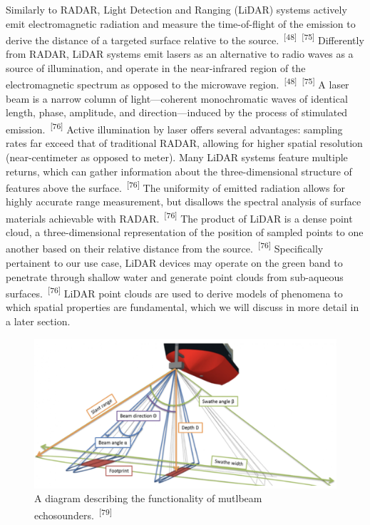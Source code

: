 \documentclass{article}
\begin{document}
\par{Similarly to RADAR, Light Detection and Ranging (LiDAR) systems actively emit electromagnetic radiation and measure the time-of-flight of the emission to derive the distance of a targeted surface relative to the source.~\textsuperscript{[48]}~\textsuperscript{[75]} Differently from RADAR, LiDAR systems emit lasers as an alternative to radio waves as a source of illumination, and operate in the near-infrared region of the electromagnetic spectrum as opposed to the microwave region.~\textsuperscript{[48]}~\textsuperscript{[75]} A laser beam is a narrow column of light---coherent monochromatic waves of identical length, phase, amplitude, and direction---induced by the process of stimulated emission.~\textsuperscript{[76]} Active illumination by laser offers several advantages: sampling rates far exceed that of traditional RADAR, allowing for higher spatial resolution (near-centimeter as opposed to meter). Many LiDAR systems feature multiple returns, which can gather information about the three-dimensional structure of features above the surface.~\textsuperscript{[76]} The uniformity of emitted radiation allows for highly accurate range measurement, but disallows the spectral analysis of surface materials achievable with RADAR.~\textsuperscript{[76]} The product of LiDAR is a dense point cloud, a three-dimensional representation of the position of sampled points to one another based on their relative distance from the source.~\textsuperscript{[76]} Specifically pertainent to our use case, LiDAR devices may operate on the green band to penetrate through shallow water and generate point clouds from sub-aqueous surfaces.~\textsuperscript{[76]} LiDAR point clouds are used to derive models of phenomena to which spatial properties are fundamental, which we will discuss in more detail in a later section.}



\begin{figure}
    \centering
    \includegraphics[width=1\linewidth]{images/mbes-diag.png}
    \caption{A diagram describing the functionality of mutlbeam echosounders.~\textsuperscript{[79]}}
    \label{figure21}
\end{figure}
\end{document}
